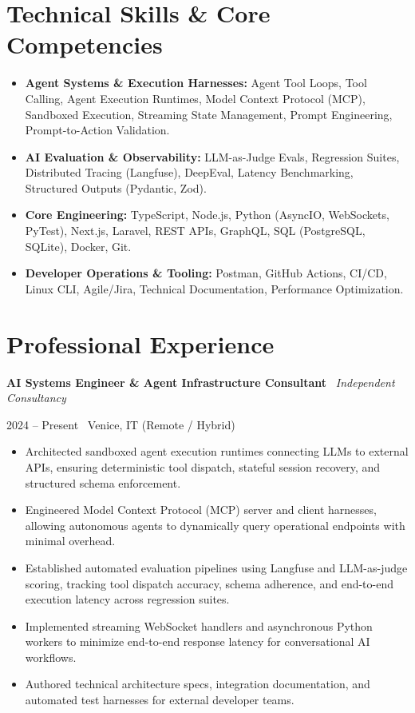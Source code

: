 \documentclass[a4paper,10pt]{article}
\newcommand{\role}[4]{%
  \vspace{2pt}\noindent
  \begin{minipage}[t]{0.70\textwidth}\raggedright\textbf{#1} \textbullet\ \textit{#3}\end{minipage}%
  \hfill
  \begin{minipage}[t]{0.28\textwidth}\raggedleft\footnotesize\color{gray}#2 \textbullet\ #4\end{minipage}%
  \vspace{1pt}%
}
\begin{document}
\section{Technical Skills \& Core Competencies}
\begin{itemize}[leftmargin=1.2em, itemsep=2pt]
  \item \textbf{Agent Systems \& Execution Harnesses:} Agent Tool Loops, Tool Calling, Agent Execution Runtimes, Model Context Protocol (MCP), Sandboxed Execution, Streaming State Management, Prompt Engineering, Prompt-to-Action Validation.
  \item \textbf{AI Evaluation \& Observability:} LLM-as-Judge Evals, Regression Suites, Distributed Tracing (Langfuse), DeepEval, Latency Benchmarking, Structured Outputs (Pydantic, Zod).
  \item \textbf{Core Engineering:} TypeScript, Node.js, Python (AsyncIO, WebSockets, PyTest), Next.js, Laravel, REST APIs, GraphQL, SQL (PostgreSQL, SQLite), Docker, Git.
  \item \textbf{Developer Operations \& Tooling:} Postman, GitHub Actions, CI/CD, Linux CLI, Agile/Jira, Technical Documentation, Performance Optimization.
\end{itemize}

\section{Professional Experience}

\role{AI Systems Engineer \& Agent Infrastructure Consultant}{2024 -- Present}{Independent Consultancy}{Venice, IT (Remote / Hybrid)}
\begin{itemize}
  \item Architected sandboxed agent execution runtimes connecting LLMs to external APIs, ensuring deterministic tool dispatch, stateful session recovery, and structured schema enforcement.
  \item Engineered Model Context Protocol (MCP) server and client harnesses, allowing autonomous agents to dynamically query operational endpoints with minimal overhead.
  \item Established automated evaluation pipelines using Langfuse and LLM-as-judge scoring, tracking tool dispatch accuracy, schema adherence, and end-to-end execution latency across regression suites.
  \item Implemented streaming WebSocket handlers and asynchronous Python workers to minimize end-to-end response latency for conversational AI workflows.
  \item Authored technical architecture specs, integration documentation, and automated test harnesses for external developer teams.
\end{itemize}
\end{document}
